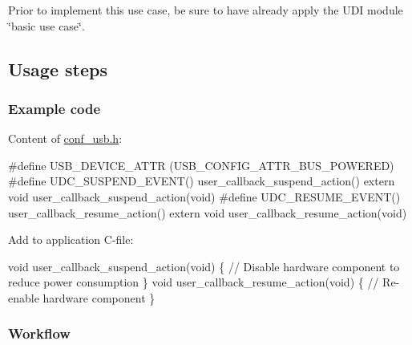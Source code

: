 Prior to implement this use case, be sure to have already apply the U\-D\-I module \char`\"{}basic use case\char`\"{}.\hypertarget{udc_use_case_5_udc_use_case_5_usage}{}\subsection{Usage steps}\label{udc_use_case_5_udc_use_case_5_usage}
\hypertarget{udc_use_case_5_udc_use_case_5_usage_code}{}\subsubsection{Example code}\label{udc_use_case_5_udc_use_case_5_usage_code}
Content of \hyperlink{conf__usb_8h}{conf\-\_\-usb.\-h}\-: 
\begin{DoxyCode}
\textcolor{preprocessor}{        #define  USB\_DEVICE\_ATTR (USB\_CONFIG\_ATTR\_BUS\_POWERED)}
\textcolor{preprocessor}{}\textcolor{preprocessor}{        #define  UDC\_SUSPEND\_EVENT()         user\_callback\_suspend\_action()}
\textcolor{preprocessor}{}        \textcolor{keyword}{extern} \textcolor{keywordtype}{void} user\_callback\_suspend\_action(\textcolor{keywordtype}{void})
        \textcolor{preprocessor}{#define  UDC\_RESUME\_EVENT()          user\_callback\_resume\_action()}
\textcolor{preprocessor}{        extern void user\_callback\_resume\_action(void)}
\end{DoxyCode}


Add to application C-\/file\-: 
\begin{DoxyCode}
        \textcolor{keywordtype}{void} user\_callback\_suspend\_action(\textcolor{keywordtype}{void})
        \{
           \textcolor{comment}{// Disable hardware component to reduce power consumption}
        \}
        \textcolor{keywordtype}{void} user\_callback\_resume\_action(\textcolor{keywordtype}{void})
        \{
           \textcolor{comment}{// Re-enable hardware component}
        \}
\end{DoxyCode}
\hypertarget{udc_use_case_5_udc_use_case_5_usage_flow}{}\subsubsection{Workflow}\label{udc_use_case_5_udc_use_case_5_usage_flow}

